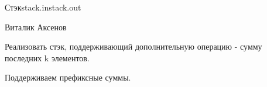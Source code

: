 \begin{proposal}{Стэк}{stack.in}{stack.out}{}

\Author

Виталик Аксенов

\ProblemIdea
      
Реализовать стэк, поддерживающий дополнительную операцию - сумму последних k элементов.

\SolutionIdea

Поддерживаем префиксные суммы.

\ProblemVariations


\ProblemComplexity                              


\WrongSolutions



\end{proposal}
